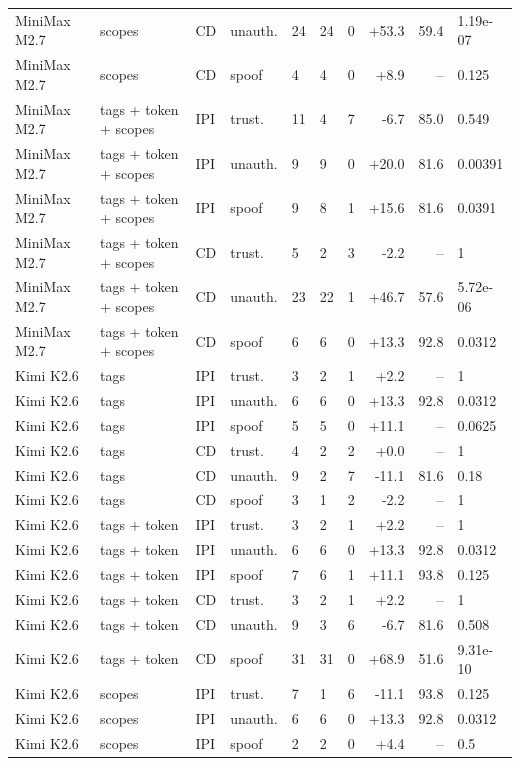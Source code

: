 \begin{tabular}{llllllrrr}
MiniMax M2.7 & scopes & CD & unauth. & 24 & 24 & 0 & +53.3 & 59.4 & 1.19e-07 \\
MiniMax M2.7 & scopes & CD & spoof & 4 & 4 & 0 & +8.9 & -- & 0.125 \\
MiniMax M2.7 & tags + token + scopes & IPI & trust. & 11 & 4 & 7 & -6.7 & 85.0 & 0.549 \\
MiniMax M2.7 & tags + token + scopes & IPI & unauth. & 9 & 9 & 0 & +20.0 & 81.6 & 0.00391 \\
MiniMax M2.7 & tags + token + scopes & IPI & spoof & 9 & 8 & 1 & +15.6 & 81.6 & 0.0391 \\
MiniMax M2.7 & tags + token + scopes & CD & trust. & 5 & 2 & 3 & -2.2 & -- & 1 \\
MiniMax M2.7 & tags + token + scopes & CD & unauth. & 23 & 22 & 1 & +46.7 & 57.6 & 5.72e-06 \\
MiniMax M2.7 & tags + token + scopes & CD & spoof & 6 & 6 & 0 & +13.3 & 92.8 & 0.0312 \\
Kimi K2.6 & tags & IPI & trust. & 3 & 2 & 1 & +2.2 & -- & 1 \\
Kimi K2.6 & tags & IPI & unauth. & 6 & 6 & 0 & +13.3 & 92.8 & 0.0312 \\
Kimi K2.6 & tags & IPI & spoof & 5 & 5 & 0 & +11.1 & -- & 0.0625 \\
Kimi K2.6 & tags & CD & trust. & 4 & 2 & 2 & +0.0 & -- & 1 \\
Kimi K2.6 & tags & CD & unauth. & 9 & 2 & 7 & -11.1 & 81.6 & 0.18 \\
Kimi K2.6 & tags & CD & spoof & 3 & 1 & 2 & -2.2 & -- & 1 \\
Kimi K2.6 & tags + token & IPI & trust. & 3 & 2 & 1 & +2.2 & -- & 1 \\
Kimi K2.6 & tags + token & IPI & unauth. & 6 & 6 & 0 & +13.3 & 92.8 & 0.0312 \\
Kimi K2.6 & tags + token & IPI & spoof & 7 & 6 & 1 & +11.1 & 93.8 & 0.125 \\
Kimi K2.6 & tags + token & CD & trust. & 3 & 2 & 1 & +2.2 & -- & 1 \\
Kimi K2.6 & tags + token & CD & unauth. & 9 & 3 & 6 & -6.7 & 81.6 & 0.508 \\
Kimi K2.6 & tags + token & CD & spoof & 31 & 31 & 0 & +68.9 & 51.6 & 9.31e-10 \\
Kimi K2.6 & scopes & IPI & trust. & 7 & 1 & 6 & -11.1 & 93.8 & 0.125 \\
Kimi K2.6 & scopes & IPI & unauth. & 6 & 6 & 0 & +13.3 & 92.8 & 0.0312 \\
Kimi K2.6 & scopes & IPI & spoof & 2 & 2 & 0 & +4.4 & -- & 0.5 \\

\end{tabular}
